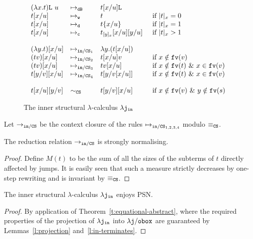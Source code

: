 \documentclass{LMCS}
\renewcommand{\>}{\rightarrow}
\def\lam{\lambda}
\newcommand{\Rew}[1]{\rightarrow_{#1}}
\newcommand{\rRew}[1]{\mapsto_{#1}}
\newcommand{\B}{{\tt dB}}
\newcommand{\dis}{{\tt j}}
\newcommand{\fv}[1]{{\tt fv}(#1)}
\newcommand{\Var}{{\tt d}}
\newcommand{\DSubs}{{\tt c}}
\newcommand{\iinn}{{\tt in}}
\newcommand{\ldisin}{\lam \dis_{\iinn}}
\newcommand{\Gc}{{\tt w}}
\newcommand{\CS}{{\tt CS}}
\newcommand{\set}[1]{ \{ #1 \}}
\newcommand{\modulo}[2]{#1/#2}
\newcommand{\ldisf}{\lam \modulo{\dis}{\fsymb}}
\newcommand{\fsymb}{\osymb\boite}
\newcommand{\osymb}{{\tt o}}
\newcommand{\eqcs}{\equiv_\CS}
\newcommand{\List}{{\tt L}}
\newcommand{\inn}{\modulo{{\tt in}}{\CS}}
\newcommand{\boite}{{\tt box}}
\begin{document}
\begin{figure}
\[\begin{array}{lll@{\hspace{.5cm}}l}
(\lam x.t)\List\ u & \rRew{\B}&  t[x/u]\List    \\
t[x/u] & \rRew{\Gc} & t &\mbox{if $|t|_x=0$}\\
t[x/u] & \rRew{\Var} & t\set{x/u} &\mbox{if $|t|_x=1$}\\
t[x/u] & \rRew{\DSubs} & t_{[y]_x}[x/u][y/u] &\mbox{if $|t|_x>1$}\\\\

(\lam y. t) [x/u] & \rRew{\inn_1} & \lam y. (t [x/u]) & \\
(t v)[x/u]  & \rRew{\inn_2} & t[x/u] v &\mbox{if }x\notin\fv{v}\\
(t v)[x/u]     & \rRew{\inn_3} & t v[x/u]&\mbox{if }x\notin\fv{t}\ \&\ x\in\fv{v}\\
t[y/v][x/u]    & \rRew{\inn_4} &  t[y/v[x/u]] &\mbox{if }x\notin\fv{t}\ \&\ x\in \fv{v}\\\\
  
  t[x/u][y/v] & \sim_{\CS} & t[y/v][x/u] &\mbox{if }x\notin\fv{v}\ \&\ y\notin\fv{s}
\end{array}\]
\caption{\label{fig:inn-oriented-f} The inner structural $\lam$-calculus $\ldisin$}
\end{figure}


Let $\Rew{\inn}$ be the context closure of the rules $\rRew{\inn_{1,2,3,4}}$ modulo $\eqcs$.

\begin{lem}
\label{l:in-terminates}
The reduction relation $\Rew{\inn}$ is strongly normalising.
\end{lem}

\begin{proof}
Define $M(t)$ to be the sum of all the sizes of the subterms of $t$ directly
affected by jumps. It is easily seen that 
such a measure strictly decreases 
by one-step rewriting and is invariant by 
$\eqcs$.
\end{proof}

\begin{cor}
The inner structural $\lam$-calculus $\ldisin$  enjoys PSN.
\end{cor}

\begin{proof}
By application of Theorem~\ref{t:equational-abstract},
where the required properties 
of the projection of $\ldisin$ into $\ldisf$
are guaranteed by Lemmas~\ref{l:projection}
and~\ref{l:in-terminates}.
\end{proof}
\end{document}
